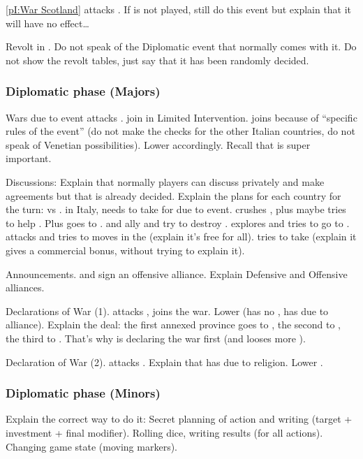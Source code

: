 \aparag \ref{pI:War Scotland}
\bparag \paysEcosse attacks \ANG.
\bparag If \ANG is not played, still do this event but explain that it will
have no effect\ldots

\aparag Revolt
\bparag \REVOLT\facemoins in \provinceCatalogne.
\bparag Do not speak of the Diplomatic event that normally comes with it. Do
not show the revolt tables, just say that it has been randomly decided.

\subsubsection{Diplomatic phase (Majors)}
\aparag Wars due to event
\bparag \FRA attacks \paysNaples. \HIS join in Limited
Intervention. \paysSavoie joins \FRA because of ``specific rules of the
event'' (do not make the checks for the other Italian countries, do not speak
of Venetian possibilities).
\bparag Lower \STAB accordingly. Recall that \STAB is super important.

\aparag Discussions: Explain that normally players can discuss privately and
make agreements but that is already decided. Explain the plans for each
country for the turn:
\bparag \ANG vs \paysEcosse.
\bparag \FRA in Italy, needs to take \villeNaples for \VPs due to event.
\bparag \HIS crushes \REVOLT, plus maybe tries to help \paysNaples. Plus goes
to \continentAmerica.
\bparag \POL and \RUS ally and try to destroy \paysDon.
\bparag \POR explores and tries to go to \continentIndia.
\bparag \TUR attacks \paysGeorgie and tries to moves in the \regionBalkans
(explain it's free for all).
\bparag \VEN tries to take \villeRagusa (explain it gives a commercial bonus,
without trying to explain it).

\aparag Announcements.
\bparag \RUS and \POL sign an offensive alliance.
\bparag Explain Defensive and Offensive alliances.

\aparag Declarations of War (1).
\bparag \RUS attacks \paysDon, \POL joins the war.
\bparag Lower \STAB (\RUS has no \CB, \POL has due to alliance).
\bparag Explain the deal: the first annexed province goes to \RUS, the second
to \paysUkraine, the third to \RUS. That's why \RUS is declaring the war
first (and looses more \STAB).

\aparag Declaration of War (2).
\bparag \TUR attacks \paysGeorgie.
\bparag Explain that \TUR has \CB due to religion. Lower \STAB.

\subsubsection{Diplomatic phase (Minors)}
\aparag Explain the correct way to do it:
\bparag Secret planning of action and writing (target + investment + final
modifier).
\bparag Rolling dice, writing results (for all actions).
\bparag Changing game state (moving markers).

